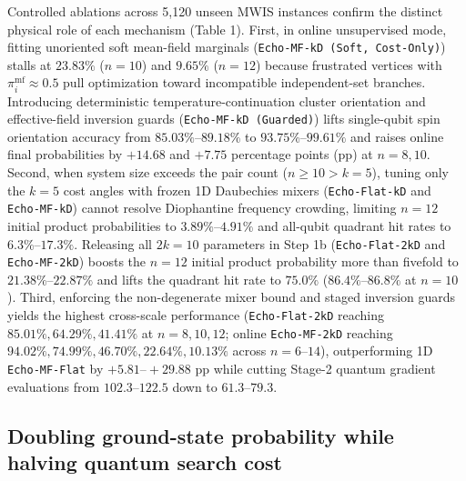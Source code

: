 \documentclass[10pt,a4paper]{article}
\begin{document}
Controlled ablations across 5,120 unseen MWIS instances confirm the distinct physical role of each mechanism (Table 1). First, in online unsupervised mode, fitting unoriented soft mean-field marginals (\texttt{Echo-MF-kD (Soft,\allowbreak\ Cost-Only)}) stalls at $23.83\%$ ($n=10$) and $9.65\%$ ($n=12$) because frustrated vertices with $\pi_i^{\mathrm{mf}} \approx 0.5$ pull optimization toward incompatible independent-set branches. Introducing deterministic temperature-continuation cluster orientation and effective-field inversion guards (\texttt{Echo-MF-kD (Guarded)}) lifts single-qubit spin orientation accuracy from $85.03\%\mbox{--}89.18\%$ to $93.75\%\mbox{--}99.61\%$ and raises online final probabilities by $+14.68$ and $+7.75$ percentage points (pp) at $n=8, 10$. Second, when system size exceeds the pair count ($n \ge 10 > k = 5$), tuning only the $k=5$ cost angles with frozen 1D Daubechies mixers (\texttt{Echo-Flat-kD} and \texttt{Echo-MF-kD}) cannot resolve Diophantine frequency crowding, limiting $n=12$ initial product probabilities to $3.89\%\mbox{--}4.91\%$ and all-qubit quadrant hit rates to $6.3\%\mbox{--}17.3\%$. Releasing all $2k=10$ parameters in Step 1b (\texttt{Echo-Flat-2kD} and \texttt{Echo-MF-2kD}) boosts the $n=12$ initial product probability more than fivefold to $21.38\%\mbox{--}22.87\%$ and lifts the quadrant hit rate to $75.0\%$ ($86.4\%\mbox{--}86.8\%$ at $n=10$). Third, enforcing the non-degenerate mixer bound and staged inversion guards yields the highest cross-scale performance (\texttt{Echo-Flat-2kD} reaching $\mathbf{85.01}\%, \mathbf{64.29}\%, \mathbf{41.41}\%$ at $n=8, 10, 12$; online \texttt{Echo-MF-2kD} reaching $\mathbf{94.02}\%, \mathbf{74.99}\%, \mathbf{46.70}\%, \mathbf{22.64}\%, \mathbf{10.13}\%$ across $n=6\mbox{--}14$), outperforming 1D \texttt{Echo-MF-Flat} by $+5.81\mbox{--}{+}29.88$ pp while cutting Stage-2 quantum gradient evaluations from $102.3\mbox{--}122.5$ down to $\mathbf{61.3\mbox{--}79.3}$.


\subsection*{Doubling ground-state probability while halving quantum search cost}
\end{document}
